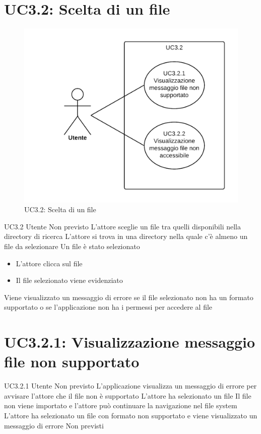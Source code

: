 \documentclass[../AnalisideiRequisiti.tex]{subfiles}
\begin{document}
	\section{UC3.2: Scelta di un file}
	\begin{figure}[H]
		\centering
		\includegraphics[width=\textwidth]{../img/UC3_2.png}
		\caption{UC3.2: Scelta di un file}
	\end{figure}
\UserCase
{UC3.2}
{Utente}
{Non previsto}
{L'attore sceglie un file tra quelli disponibili nella directory di ricerca}
{L'attore si trova in una directory nella quale c'è almeno un file da selezionare}
{Un file è stato selezionato}
{
	\begin{itemize}
		\item{} L'attore clicca sul file
		\item{} Il file selezionato viene evidenziato
	\end{itemize}
}
{Viene visualizzato un messaggio di errore se il file selezionato non ha un formato supportato  o se l'applicazione non ha i permessi per accedere al file }

\section{UC3.2.1: Visualizzazione messaggio file non supportato}
\UserCase
{UC3.2.1}
{Utente}
{Non previsto}
{L'applicazione visualizza un messaggio di errore per avvisare l'attore che il file non è supportato}
{L'attore ha selezionato un file }
{Il file non viene importato e l'attore può continuare la navigazione nel file system}
{L'attore ha selezionato un file con formato non supportato e viene visualizzato un messaggio di errore}
{Non previsti}
\end{document}
